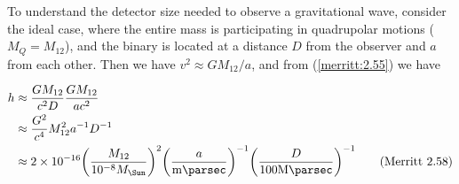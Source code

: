 \documentclass[degn-notes.tex]{subfiles}
\begin{document}
To understand the detector size needed to observe a gravitational wave, consider the ideal case, where the entire mass is participating in quadrupolar motions ($M_Q = M_{12}$), and the binary is located at a distance $D$ from the observer and $a$ from each other. Then we have $v^2 \approx G M_{12} / a$, and from (\ref{merritt:2.55}) we have

\begin{align*}
  h &\approx
  \frac{G M_{12}}{c^2 D} \frac{G M_{12}}{a c^2}
  \\ &\approx
  \frac{G^2}{c^4} M_{12}^2 a^{-1} D^{-1}
  \\ &\approx
  \num{2e-16}
    \qty(\frac{M_{12}}{10^{-8} M_{\Sun}})^2
    \qty(\frac{a}{\si{\milli\parsec}})^{-1}
    \qty(\frac{D}{100\si{\mega\parsec}})^{-1}
%
  \tag{Merritt 2.58}
  \label{merritt:2.58}
\end{align*}
\end{document}
